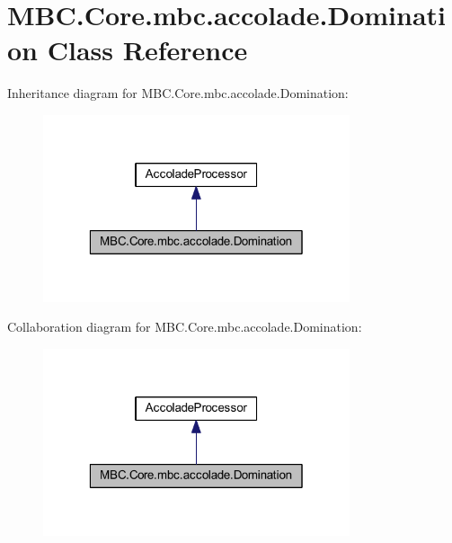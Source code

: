 \hypertarget{class_m_b_c_1_1_core_1_1mbc_1_1accolade_1_1_domination}{\section{M\-B\-C.\-Core.\-mbc.\-accolade.\-Domination Class Reference}
\label{class_m_b_c_1_1_core_1_1mbc_1_1accolade_1_1_domination}
}


Inheritance diagram for M\-B\-C.\-Core.\-mbc.\-accolade.\-Domination\-:
\nopagebreak
\begin{figure}[H]
\begin{center}
\leavevmode
\includegraphics[width=256pt]{class_m_b_c_1_1_core_1_1mbc_1_1accolade_1_1_domination__inherit__graph}
\end{center}
\end{figure}


Collaboration diagram for M\-B\-C.\-Core.\-mbc.\-accolade.\-Domination\-:
\nopagebreak
\begin{figure}[H]
\begin{center}
\leavevmode
\includegraphics[width=256pt]{class_m_b_c_1_1_core_1_1mbc_1_1accolade_1_1_domination__coll__graph}
\end{center}
\end{figure}
